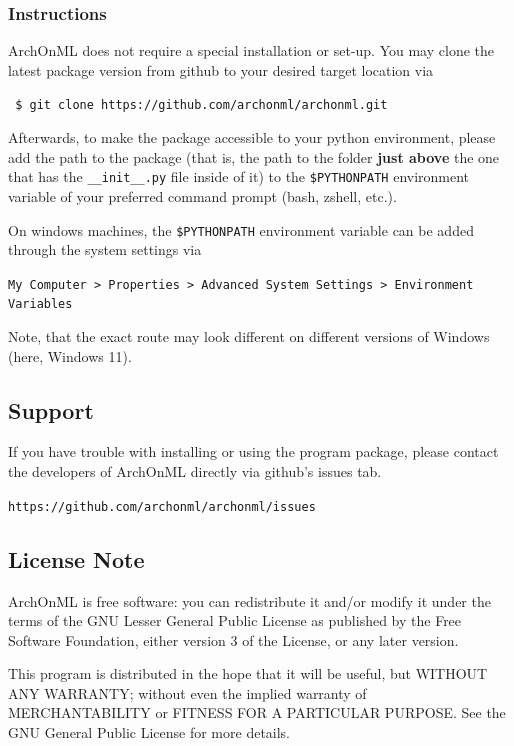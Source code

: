\documentclass[12pt]{achemso}
\begin{document}
\subsubsection{Instructions}

ArchOnML does not require a special installation or set-up. You may clone the latest package version from github to your desired target location via

\verb+ $ git clone https://github.com/archonml/archonml.git+

\noindent Afterwards, to make the package accessible to your python environment, please add the path to the package (that is, the path to the folder \textbf{just above} the one that has the \verb+__init__.py+ file inside of it) to the \verb+$PYTHONPATH+ environment variable of your preferred command prompt (bash, zshell, etc.).

\noindent On windows machines, the \verb+$PYTHONPATH+ environment variable can be added through the system settings via

\noindent \verb+My Computer > Properties > Advanced System Settings > Environment Variables+

\noindent Note, that the exact route may look different on different versions of Windows (here, Windows 11).

\newpage

\subsection{Support}

If you have trouble with installing or using the program package, please contact the developers of ArchOnML directly via github's issues tab.

\texttt{https://github.com/archonml/archonml/issues}

\subsection{License Note}

ArchOnML is free software: you can redistribute it and/or modify it under the terms of the GNU Lesser General Public License as published by the Free Software Foundation, either version 3 of the License, or any later version.

\noindent This program is distributed in the hope that it will be useful, but WITHOUT ANY WARRANTY; without even the implied warranty of MERCHANTABILITY or FITNESS FOR A PARTICULAR PURPOSE.  See the GNU General Public License for more details.
\end{document}
